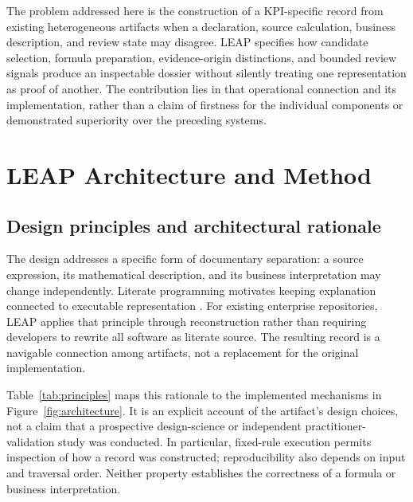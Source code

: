 \documentclass[a4paper,fleqn]{cas-dc}
\newcommand{\tool}{\textsc{LEAP}}
\begin{document}
The problem addressed here is the construction of a KPI-specific record from existing heterogeneous artifacts when a declaration, source calculation, business description, and review state may disagree. LEAP specifies how candidate selection, formula preparation, evidence-origin distinctions, and bounded review signals produce an inspectable dossier without silently treating one representation as proof of another. The contribution lies in that operational connection and its implementation, rather than a claim of firstness for the individual components or demonstrated superiority over the preceding systems.

\section{LEAP Architecture and Method}
\label{sec:method}

\subsection{Design principles and architectural rationale}

The design addresses a specific form of documentary separation: a source expression, its mathematical description, and its business interpretation may change independently. Literate programming motivates keeping explanation connected to executable representation \citep{Knuth1984}. For existing enterprise repositories, \tool{} applies that principle through reconstruction rather than requiring developers to rewrite all software as literate source. The resulting record is a navigable connection among artifacts, not a replacement for the original implementation.

Table~\ref{tab:principles} maps this rationale to the implemented mechanisms in Figure~\ref{fig:architecture}. It is an explicit account of the artifact's design choices, not a claim that a prospective design-science or independent practitioner-validation study was conducted. In particular, fixed-rule execution permits inspection of how a record was constructed; reproducibility also depends on input and traversal order. Neither property establishes the correctness of a formula or business interpretation.
\end{document}
